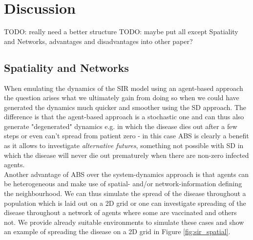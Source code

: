 \section{Discussion}
TODO: really need a better structure
TODO: maybe put all except Spatiality and Networks, advantages and disadvantages into other paper?

\subsection{Spatiality and Networks}
When emulating the dynamics of the SIR model using an agent-based approach the question arises what we ultimately gain from doing so when we could have generated the dynamics much quicker and smoother using the SD approach. The difference is that the agent-based approach is a stochastic one and can thus also generate "degenerated" dynamics e.g. in which the disease dies out after a few steps or even can't spread from patient zero - in this case ABS is clearly a benefit as it allows to investigate \textit{alternative futures}, something not possible with SD in which the disease will never die out prematurely when there are non-zero infected agents. \\
Another advantage of ABS over the system-dynamics approach is that agents can be heterogeneous and make use of spatial- and/or network-information defining the neighbourhood. We can thus simulate the spread of the disease throughout a population which is laid out on a 2D grid or one can investigate spreading of the disease throughout a network of agents where some are vaccinated and others not. We provide already suitable environments to simulate these cases and show an example of spreading the disease on a 2D grid in Figure \ref{fig:sir_spatial}.  

